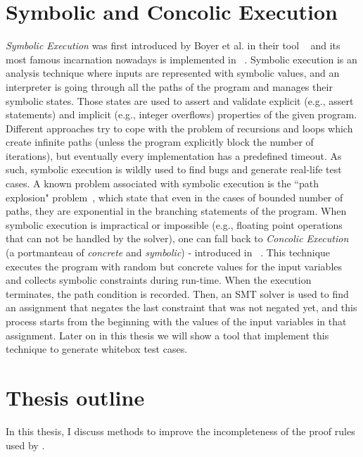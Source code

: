 \section{Symbolic and Concolic Execution}
\label{sec:symbex}
\emph{Symbolic Execution} was first introduced by Boyer et al. in their tool ~\cite{10.1145/390016.808445} and its most famous incarnation nowadays is implemented in ~\cite{10.5555/1855741.1855756}. Symbolic execution is an analysis technique where inputs are represented with symbolic values, and an interpreter is going through all the paths of the program and manages their symbolic states. Those states are used to assert and validate explicit (e.g., assert statements) and implicit (e.g., integer overflows) properties of the given program. Different approaches try to cope with the problem of recursions and loops which create infinite paths (unless the program explicitly block the number of iterations), but eventually every implementation has a predefined timeout. As such, symbolic execution is wildly used to find bugs and generate real-life test cases. A known problem associated with symbolic execution is the ``path explosion" problem~\cite{10.1007/978-3-540-78800-3_28}, which state that even in the cases of bounded number of paths, they are exponential in the branching statements of the program. When symbolic execution is impractical or impossible (e.g., floating point operations that can not be handled by the  solver), one can fall back to \emph{Concolic Execution} (a portmanteau of \emph{concrete} and \emph{symbolic}) - introduced in ~\cite{10.1145/1064978.1065036}. This technique executes the program with random but concrete values for the input variables and collects symbolic constraints during run-time. When the execution terminates, the path condition is recorded.  Then, an SMT solver is used to find an assignment that negates the last constraint that was not negated yet, and this process starts from the beginning with the values of the input variables in that assignment. Later on in this thesis we will show a tool that implement this technique to generate whitebox test cases. 

\section{Thesis outline}
\label{sec:outline}
In this thesis, I discuss methods to improve the incompleteness of the proof rules used by . 

